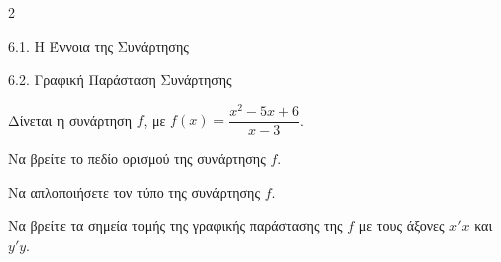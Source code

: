 \begin{ylh}{2}
    \item 6.1. Η Έννοια της Συνάρτησης
    \item 6.2. Γραφική Παράσταση Συνάρτησης
\end{ylh}
Δίνεται η συνάρτηση $f$, με $f(x) = \dfrac{x^2 - 5x + 6}{x - 3}$.
\begin{alist}
\item Να βρείτε το πεδίο ορισμού της συνάρτησης $f$. 
\item Να απλοποιήσετε τον τύπο της συνάρτησης $f$. 
\item Να βρείτε τα σημεία τομής της γραφικής παράστασης της $f$ με τους άξονες $x'x$ και $y'y$. 
\end{alist}

